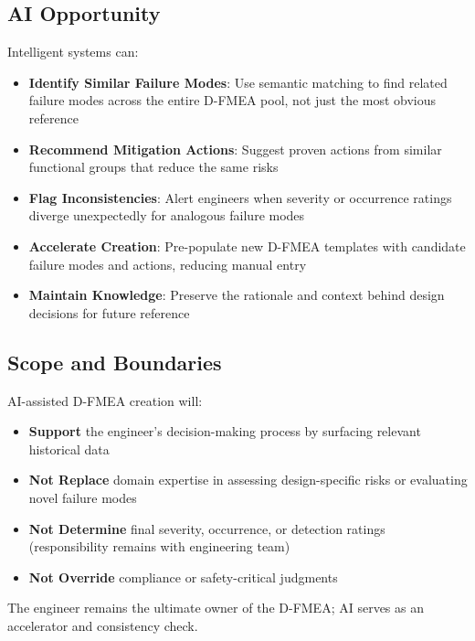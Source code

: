 \subsection*{AI Opportunity}

Intelligent systems can:

\begin{itemize}
    \item \textbf{Identify Similar Failure Modes}: Use semantic matching to find related failure modes across the entire D-FMEA pool, not just the most obvious reference
    \item \textbf{Recommend Mitigation Actions}: Suggest proven actions from similar functional groups that reduce the same risks
    \item \textbf{Flag Inconsistencies}: Alert engineers when severity or occurrence ratings diverge unexpectedly for analogous failure modes
    \item \textbf{Accelerate Creation}: Pre-populate new D-FMEA templates with candidate failure modes and actions, reducing manual entry
    \item \textbf{Maintain Knowledge}: Preserve the rationale and context behind design decisions for future reference
\end{itemize}

\subsection*{Scope and Boundaries}

AI-assisted D-FMEA creation will:

\begin{itemize}
    \item \textbf{Support} the engineer's decision-making process by surfacing relevant historical data
    \item \textbf{Not Replace} domain expertise in assessing design-specific risks or evaluating novel failure modes
    \item \textbf{Not Determine} final severity, occurrence, or detection ratings (responsibility remains with engineering team)
    \item \textbf{Not Override} compliance or safety-critical judgments
\end{itemize}

The engineer remains the ultimate owner of the D-FMEA; AI serves as an accelerator and consistency check.
